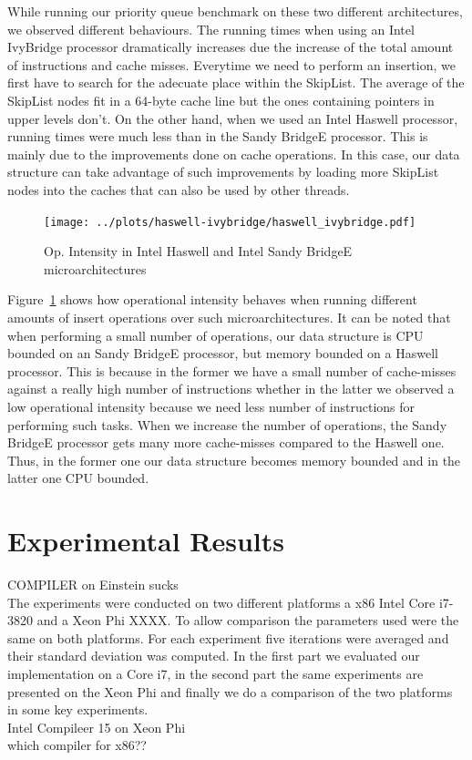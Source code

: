 While running our priority queue benchmark on these two different architectures, we observed different behaviours. The running times when using an Intel IvyBridge processor dramatically increases due the increase of the total amount of instructions and cache misses. Everytime we need to perform an insertion, we first have to search for the adecuate place within the SkipList. The average of the SkipList nodes fit in a 64-byte cache line but the ones containing pointers in upper levels don't. On the other hand, when we used an Intel Haswell processor, running times were much less than in the Sandy BridgeE processor. This is mainly due to the improvements done on cache operations. In this case, our data structure can take advantage of such improvements by loading more SkipList nodes into the caches that can also be used by other threads.

\begin{figure}
	\centering
  	\texttt{[image: ../plots/haswell-ivybridge/haswell\_ivybridge.pdf]}
	\caption{Op. Intensity in Intel Haswell and Intel Sandy BridgeE microarchitectures}
	\label{fig:haswell_ivybridge}
\end{figure}

Figure~\ref{fig:haswell_ivybridge} shows how operational intensity behaves when running different amounts of insert operations over such microarchitectures. It can be noted that when performing a small number of operations, our data structure is CPU bounded on an Sandy BridgeE processor, but memory bounded on a Haswell processor. This is because in the former we have a small number of cache-misses against a really high number of instructions whether in the latter we observed a low operational intensity because we need less number of instructions for performing such tasks. When we increase the number of operations, the Sandy BridgeE processor gets many more cache-misses compared to the Haswell one. Thus, in the former one our data structure becomes memory bounded and in the latter one CPU bounded.

\section{Experimental Results}
COMPILER on Einstein sucks\\
The experiments were conducted on two different platforms a x86 Intel Core i7-3820 and a Xeon Phi XXXX. To allow comparison the parameters used were the same on both platforms. For each experiment five iterations were averaged and their standard deviation was computed. In the first part we evaluated our implementation on a Core i7, in the second part the same experiments are presented on the Xeon Phi and finally we do a comparison of the two platforms in some key experiments.\\
Intel Compileer 15 on Xeon Phi\\
which compiler for x86??

